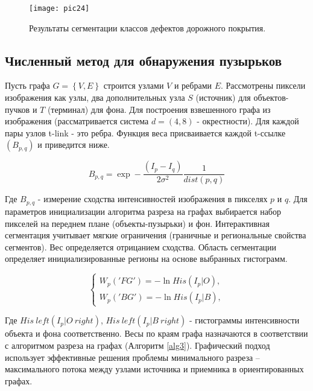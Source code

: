 \documentclass[a4paper,14pt]{extreport}
\begin{document}
\begin{figure}[ht!]
\centering
\texttt{[image: pic24]}
\caption{Результаты сегментации классов дефектов дорожного покрытия.}
	\label{pic24}
		\end{figure}
\subsection{Численный метод для обнаружения пузырьков}
Пусть графа $ G = \left\{V, E \right\} $ строится узлами $ V $ и ребрами $ E $. Рассмотрены пиксели изображения как узлы, два дополнительных узла $ S $ (источник) для объектов-пучков и $ T $ (терминал) для фона. Для построения взвешенного графа из изображения (рассматривается система $ d = \left(4,8 \right) $ - окрестности). Для каждой пары узлов t-link - это ребра. Функция веса присваивается каждой t-ссылке $ \left (B_ {p, q} \right) $  и приведится ниже.

\begin{equation} \label{eq9}
B_{p,q}= \exp - \frac{\left(I_p - I_q\right)}{2\sigma^2} \frac{1}{dist\left(p,q\right)}
\end{equation}

Где $ B_ {p, q} $ - измерение сходства интенсивностей изображения в пикселях $ p $ и $ q $. Для параметров инициализации алгоритма разреза на графах выбирается набор пикселей на переднем плане (объекты-пузырьки) и фон. Интерактивная сегментация учитывает мягкие ограничения (граничные и региональные свойства сегментов). Вес определяется отрицанием сходства. Область сегментации определяет инициализированные регионы на основе выбранных гистограмм.


\begin{equation} \label{eq10}
\left\{\begin{array}{l} W_p\left('FG'\right)=-\ln His\left(I_p|O\right),\\
W_p\left('BG'\right)=-\ln His\left(I_p|B\right),
\end{array}\right.
\end{equation}

Где $ His \ left (I_p | O \ right) $, $ His \ left (I_p | B \ right) $ - гистограммы интенсивности объекта и фона соответственно. Весы по краям графа назначаются в соответствии с алгоритмом разреза на графах (Алгоритм \ref{alg3}). Графический подход использует эффективные решения проблемы минимального разреза -- максимального потока между узлами источника и приемника в ориентированных графах.
\end{document}
